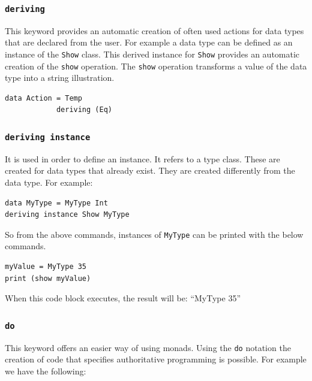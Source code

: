 \documentclass[a4paper, titlepage, twoside]{article}
\begin{document}
\subsubsection{\texttt{deriving}}
\label{sec:org221cbf6}

This keyword provides an automatic creation of often used actions for data types that are declared from the user. For example a data type can be defined as an instance of the \texttt{Show} class. This derived instance for \texttt{Show} provides an automatic creation of the \texttt{show} operation. The \texttt{show} operation transforms a value of the data type into a string illustration.

\begin{verbatim}
data Action = Temp
            deriving (Eq)
\end{verbatim}

\subsubsection{\texttt{deriving instance}}
\label{sec:org468c641}

It is used in order to define an instance. It refers to a type class. These are created for data types that already exist. They are created differently from the data type. For example:

\begin{verbatim}
data MyType = MyType Int
deriving instance Show MyType
\end{verbatim}

So from the above commands, instances of \texttt{MyType} can be printed with the below commands.

\begin{listing}[H]
\begin{verbatim}
myValue = MyType 35
print (show myValue)
\end{verbatim}
\caption{When this code block executes, the result will be: ``MyType 35''}
\end{listing}

\subsubsection{\texttt{do}}
\label{sec:orgd4f714e}

This keyword offers an easier way of using monads. Using the \texttt{do} notation the creation of code that specifies authoritative programming is possible. For example we have the following:
\end{document}

